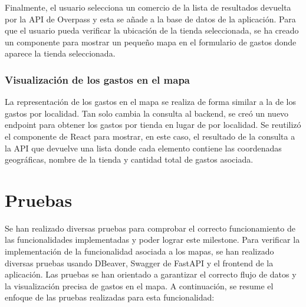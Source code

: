 Finalmente, el usuario selecciona un comercio de la lista de resultados devuelta por la API de Overpass y esta se añade a la base de datos de la aplicación. Para que el usuario pueda verificar la ubicación de la tienda seleccionada, se ha creado un componente para mostrar un pequeño mapa en el formulario de gastos donde aparece la tienda seleccionada.

\subsubsection{Visualización de los gastos en el mapa}
La representación de los gastos en el mapa se realiza de forma similar a la de los gastos por localidad. Tan solo cambia la consulta al backend, se creó un nuevo endpoint para obtener los gastos por tienda en lugar de por localidad. Se reutilizó el componente de React para mostrar, en este caso, el resultado de la consulta a la API que devuelve una lista donde cada elemento contiene las coordenadas geográficas, nombre de la tienda y cantidad total de gastos asociada.

\section{Pruebas}
Se han realizado diversas pruebas para comprobar el correcto funcionamiento de las funcionalidades implementadas y poder lograr este milestone. 
Para verificar la implementación de la funcionalidad asociada a los mapas, se han realizado diversas pruebas usando DBeaver, Swagger de FastAPI y el frontend de la aplicación. Las pruebas se han orientado a garantizar el correcto flujo de datos y la visualización precisa de gastos en el mapa. A continuación, se resume el enfoque de las pruebas realizadas para esta funcionalidad:

